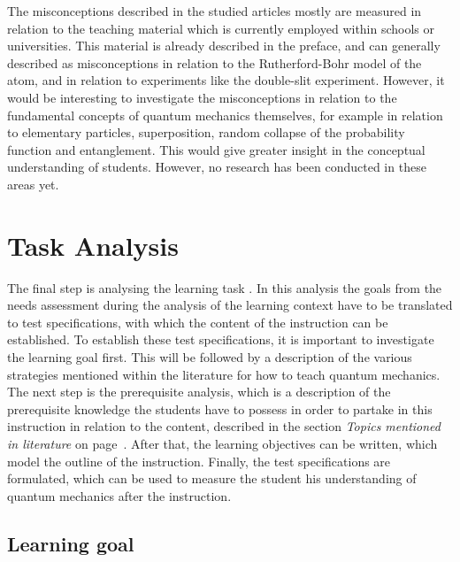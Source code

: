 \documentclass[11pt,twoside]{report} %
\begin{document}
The misconceptions described in the studied articles mostly are measured in relation to the teaching material which is currently employed within schools or universities. This material is already described in the preface, and can generally described as misconceptions in relation to the Rutherford-Bohr model of the atom, and in relation to experiments like the double-slit experiment. However, it would be interesting to investigate the misconceptions in relation to the fundamental concepts of quantum mechanics themselves, for example in relation to elementary particles, superposition, random collapse of the probability function and entanglement. This would give greater insight in the conceptual understanding of students. However, no research has been conducted in these areas yet.


\section{Task Analysis}

The final step is analysing the learning task \cite{smithragan}. In this analysis the goals from the needs assessment during the analysis of the learning context have to be translated to test specifications, with which the content of the instruction can be established. To establish these test specifications, it is important to investigate the learning goal first. This will be followed by a description of the various strategies mentioned within the literature for how to teach quantum mechanics. The next step is the prerequisite analysis, which is a description of the prerequisite knowledge the students have to possess in order to partake in this instruction in relation to the content, described in the section \emph{Topics mentioned in literature} on page~\pageref{sssec:topicsliterature}. After that, the learning objectives can be written, which model the outline of the instruction. Finally, the test specifications are formulated, which can be used to measure the student his understanding of quantum mechanics after the instruction.

\subsection{Learning goal}
\end{document}
